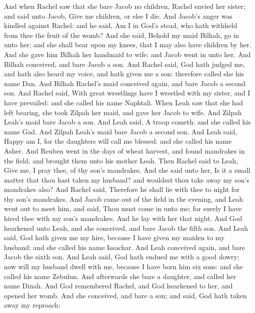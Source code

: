 \begin{biblechapter} %
\verse And when Rachel saw that she bare Jacob no children, Rachel envied her sister; and said unto Jacob, Give me children, or else I die.
\verse And Jacob's anger was kindled against Rachel: and he said, Am I in God's stead, who hath withheld from thee the fruit of the womb?
\verse And she said, Behold my maid Bilhah, go in unto her; and she shall bear upon my knees, that I may also have children by her.
\verse And she gave him Bilhah her handmaid to wife: and Jacob went in unto her.
\verse And Bilhah conceived, and bare Jacob a son.
\verse And Rachel said, God hath judged me, and hath also heard my voice, and hath given me a son: therefore called she his name Dan.
\verse And Bilhah Rachel's maid conceived again, and bare Jacob a second son.
\verse And Rachel said, With great wrestlings have I wrestled with my sister, and I have prevailed: and she called his name Naphtali.
\verse When Leah saw that she had left bearing, she took Zilpah her maid, and gave her Jacob to wife.
\verse And Zilpah Leah's maid bare Jacob a son.
\verse And Leah said, A troop cometh: and she called his name Gad.
\verse And Zilpah Leah's maid bare Jacob a second son.
\verse And Leah said, Happy am I, for the daughters will call me blessed: and she called his name Asher.
\verse And Reuben went in the days of wheat harvest, and found mandrakes in the field, and brought them unto his mother Leah. Then Rachel said to Leah, Give me, I pray thee, of thy son's mandrakes.
\verse And she said unto her, Is it a small matter that thou hast taken my husband? and wouldest thou take away my son's mandrakes also? And Rachel said, Therefore he shall lie with thee to night for thy son's mandrakes.
\verse And Jacob came out of the field in the evening, and Leah went out to meet him, and said, Thou must come in unto me; for surely I have hired thee with my son's mandrakes. And he lay with her that night.
\verse And God hearkened unto Leah, and she conceived, and bare Jacob the fifth son.
\verse And Leah said, God hath given me my hire, because I have given my maiden to my husband: and she called his name Issachar.
\verse And Leah conceived again, and bare Jacob the sixth son.
\verse And Leah said, God hath endued me with a good dowry; now will my husband dwell with me, because I have born him six sons: and she called his name Zebulun.
\verse And afterwards she bare a daughter, and called her name Dinah.
\verse And God remembered Rachel, and God hearkened to her, and opened her womb.
\verse And she conceived, and bare a son; and said, God hath taken away my reproach:

\end{biblechapter}
